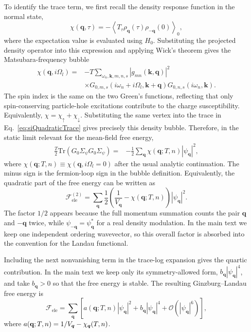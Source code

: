 \documentclass[aps,prx,article,twocolumn,amsmath,amssymb,superscriptaddress,longbibliography]{revtex4-2}
\begin{document}
To identify the trace term, we first recall the density response function
in the normal state,
\begin{equation}
\chi(\mathbf q,\tau)
=
-
\left\langle
T_\tau
\rho_{\mathbf q}(\tau)
\rho_{-\mathbf q}(0)
\right\rangle_{0},
\end{equation}
where the expectation value is evaluated using $H_0$.  Substituting the
projected density operator into this expression and applying Wick's
theorem gives the Matsubara-frequency bubble
\begin{align}
\chi(\mathbf q,i\Omega_l)
=&
-
T
\sum_{\omega_n,\mathbf k,m,n,s}
\left|
g_{mn}(\mathbf k,\mathbf q)
\right|^2
\nonumber\\
&\times
G_{0,m,s}(i\omega_n+i\Omega_l,\mathbf k+\mathbf q)
G_{0,n,s}(i\omega_n,\mathbf k).
\end{align}
The spin index is the same on the two Green's functions, reflecting that
only spin-conserving particle-hole excitations contribute to the charge
susceptibility.  Equivalently, $\chi=\chi_\uparrow+\chi_\downarrow$.
Substituting the same vertex into the trace in
Eq.~\eqref{eq:siQuadraticTrace} gives precisely this density bubble.
Therefore, in the static limit relevant for the
mean-field free energy,
\begin{align}\label{eq:siBubbleTrace}
\frac{T}{2}
\mathrm{Tr}
\left(
G_0\Sigma_\psi
G_0\Sigma_\psi
\right)
=&
-
\frac{1}{2}
\sum_{\mathbf q}
\chi(\mathbf q;T,n)
|\psi_{\mathbf q}|^2 ,
\end{align}
where $\chi(\mathbf q;T,n)\equiv \chi(\mathbf q,i\Omega_l=0)$ after the
usual analytic continuation.  The minus sign is the fermion-loop sign in
the bubble definition.  Equivalently, the quadratic part of the free
energy can be written as
\begin{equation}
\mathcal F_{\mathrm{ele}}^{(2)}
=
\sum_{\mathbf q}
\frac{1}{2}
\left(\frac{1}{V_{\mathbf q}}
-
\chi(\mathbf q;T,n)
\right)
|\psi_{\mathbf q}|^2 .
\end{equation}
The factor $1/2$ appears because the full momentum summation counts the
pair $\mathbf q$ and $-\mathbf q$ twice, while
$\psi_{-\mathbf q}=\psi_{\mathbf q}^{*}$ for a real density modulation.
In the main text we keep one independent ordering wavevector, so this
overall factor is absorbed into the convention for the Landau functional.

Including the next nonvanishing term in the trace-log expansion gives the
quartic contribution.  In the main text we keep only its symmetry-allowed
form, $b_{\mathbf q}|\psi_{\mathbf q}|^4$, and take $b_{\mathbf q}>0$ so
that the free energy is stable.  The resulting Ginzburg--Landau free
energy is
\begin{equation}
\mathcal F_{\mathrm{ele}}
=
\sum_{\mathbf q} \left[
a(\mathbf q;T,n)
|\psi_{\mathbf q}|^2
+
b_{\mathbf q}
|\psi_{\mathbf q}|^4
+
\mathcal{O}(|\psi_{\mathbf q}|^6) \right],
\end{equation}
where $a(\mathbf q;T,n) = 1/V_{\vb*{q}} - \chi_{\vb*{q}}(T,n)$.
\end{document}
